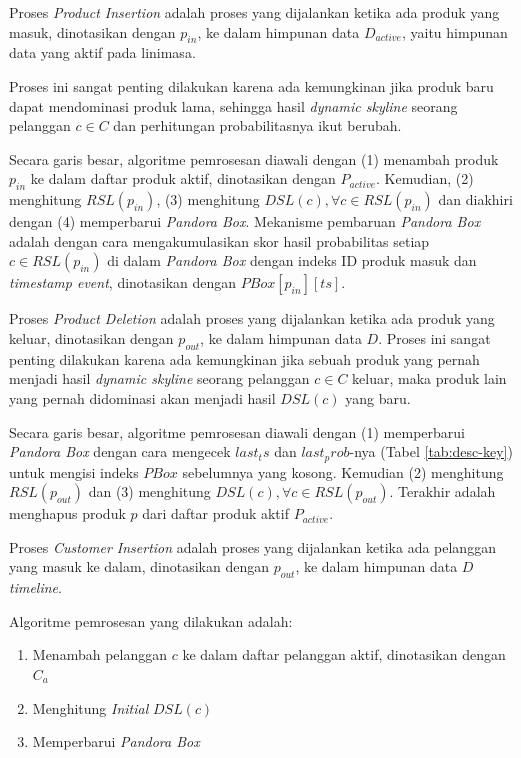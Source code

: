 
Proses \textit{Product Insertion} adalah proses yang dijalankan ketika ada produk yang masuk, dinotasikan dengan $p_{in}$, ke dalam himpunan data $D_{active}$, yaitu himpunan data yang aktif pada linimasa.

Proses ini sangat penting dilakukan karena ada kemungkinan jika produk baru dapat mendominasi produk lama, sehingga hasil \textit{dynamic skyline} seorang pelanggan $c \in C$ dan perhitungan probabilitasnya ikut berubah.

Secara garis besar, algoritme pemrosesan diawali dengan (1) menambah produk $p_{in}$ ke dalam daftar produk aktif, dinotasikan dengan $P_{active}$. Kemudian, (2) menghitung $RSL(p_{in})$, (3) menghitung $DSL(c), \forall c \in RSL(p_{in})$ dan diakhiri dengan (4) memperbarui \textit{Pandora Box}. Mekanisme pembaruan \textit{Pandora Box} adalah dengan cara mengakumulasikan skor hasil probabilitas setiap $c \in RSL(p_{in})$ di dalam \textit{Pandora Box} dengan indeks ID produk masuk dan \textit{timestamp event}, dinotasikan dengan $PBox[p_{in}][ts]$.



Proses \textit{Product Deletion} adalah proses yang dijalankan ketika ada produk yang keluar, dinotasikan dengan $p_{out}$, ke dalam himpunan data $D$. Proses ini sangat penting dilakukan karena ada kemungkinan jika sebuah produk yang pernah menjadi hasil \textit{dynamic skyline} seorang pelanggan $c \in C$ keluar, maka produk lain yang pernah didominasi akan menjadi hasil $DSL(c)$ yang baru.

Secara garis besar, algoritme pemrosesan diawali dengan (1) memperbarui \textit{Pandora Box} dengan cara mengecek $last_ts$ dan $last_prob$-nya (Tabel \ref{tab:desc-key}) untuk mengisi indeks $PBox$ sebelumnya yang kosong. Kemudian (2) menghitung $RSL(p_{out})$ dan (3) menghitung $DSL(c), \forall c \in RSL(p_{out})$. Terakhir adalah menghapus produk $p$ dari daftar produk aktif $P_{active}$.


Proses \textit{Customer Insertion} adalah proses yang dijalankan ketika ada pelanggan yang masuk ke dalam, dinotasikan dengan $p_{out}$, ke dalam himpunan data $D$\textit{timeline}. 

Algoritme pemrosesan yang dilakukan adalah:
\begin{enumerate}
	\item Menambah pelanggan $c$ ke dalam daftar pelanggan aktif, dinotasikan dengan $C_a$
	\item Menghitung \textit{Initial} $DSL(c)$ 
	\item Memperbarui \textit{Pandora Box}
\end{enumerate}

